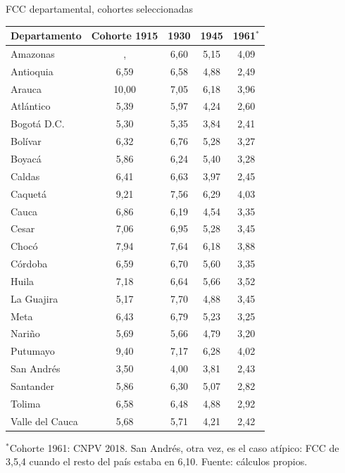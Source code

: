 \documentclass[11pt,aspectratio=169]{beamer}
\begin{document}
\begin{frame}{FCC departamental, cohortes seleccionadas}
\begin{center}
{\tiny\begin{tabular}{lcccc}\toprule
Departamento & Cohorte 1915 & 1930 & 1945 & 1961$^{*}$ \\ \midrule
Amazonas & , & 6{,}60 & 5{,}15 & 4{,}09 \\
Antioquia & 6{,}59 & 6{,}58 & 4{,}88 & 2{,}49 \\
Arauca & 10{,}00 & 7{,}05 & 6{,}18 & 3{,}96 \\
Atlántico & 5{,}39 & 5{,}97 & 4{,}24 & 2{,}60 \\
Bogotá D.C. & 5{,}30 & 5{,}35 & 3{,}84 & 2{,}41 \\
Bolívar & 6{,}32 & 6{,}76 & 5{,}28 & 3{,}27 \\
Boyacá & 5{,}86 & 6{,}24 & 5{,}40 & 3{,}28 \\
Caldas & 6{,}41 & 6{,}63 & 3{,}97 & 2{,}45 \\
Caquetá & 9{,}21 & 7{,}56 & 6{,}29 & 4{,}03 \\
Cauca & 6{,}86 & 6{,}19 & 4{,}54 & 3{,}35 \\
Cesar & 7{,}06 & 6{,}95 & 5{,}28 & 3{,}45 \\
Chocó & 7{,}94 & 7{,}64 & 6{,}18 & 3{,}88 \\
Córdoba & 6{,}59 & 6{,}70 & 5{,}60 & 3{,}35 \\
Huila & 7{,}18 & 6{,}64 & 5{,}66 & 3{,}52 \\
La Guajira & 5{,}17 & 7{,}70 & 4{,}88 & 3{,}45 \\
Meta & 6{,}43 & 6{,}79 & 5{,}23 & 3{,}25 \\
Nariño & 5{,}69 & 5{,}66 & 4{,}79 & 3{,}20 \\
Putumayo & 9{,}40 & 7{,}17 & 6{,}28 & 4{,}02 \\
San Andrés & 3{,}50 & 4{,}00 & 3{,}81 & 2{,}43 \\
Santander & 5{,}86 & 6{,}30 & 5{,}07 & 2{,}82 \\
Tolima & 6{,}58 & 6{,}48 & 4{,}88 & 2{,}92 \\
Valle del Cauca & 5{,}68 & 5{,}71 & 4{,}21 & 2{,}42 \\
\bottomrule\end{tabular}}
\end{center}
{\scriptsize $^{*}$Cohorte 1961: CNPV 2018. San Andr\'es, otra vez, es
el caso at\'ipico: FCC de 3{,}5,4 cuando el resto del pa\'is estaba en
6,10. Fuente: c\'alculos propios.}
\end{frame}
\end{document}
